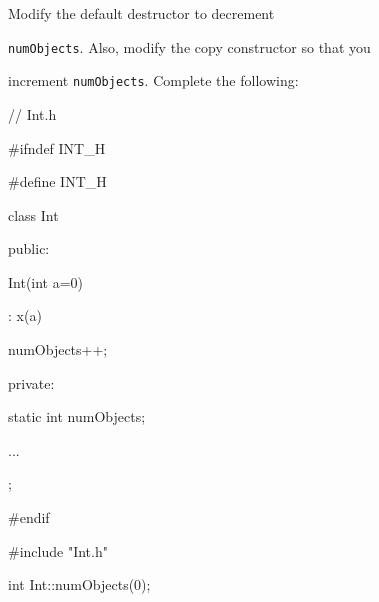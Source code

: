 Modify the default destructor to decrement

\texttt{numObjects}. Also, modify the copy constructor so that you

increment \texttt{numObjects}. Complete the following:



\begin{consolethree}[escapeinside=||]

// Int.h

#ifndef INT_H

#define INT_H



class Int

{

public:

    Int(int a=0)

        : x(a)

    {

        numObjects++;

    }

private:

    static int numObjects;

    ...

};



#endif

\end{consolethree}



\begin{consolethree}[escapeinside=||]

#include "Int.h"



int Int::numObjects(0);

\end{consolethree}



